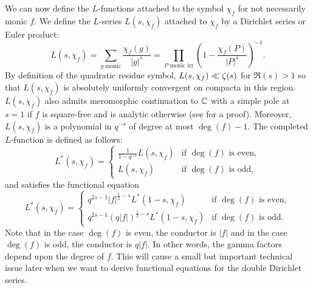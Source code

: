 \documentclass[12pt,reqno,oneside]{amsart}
\begin{document}
    We can now define the $L$-functions attached to the symbol $\chi_{f}$ for not necessarily monic $f$. We define the $L$-series $L(s,\chi_{f})$ attached to $\chi_{f}$ by a Dirichlet series or Euler product:
    \[
        L(s,\chi_{f}) = \sum_{\text{$g$ monic}}\frac{\chi_{f}(g)}{|g|^{s}} = \prod_{\text{$P$ monic irr}}\left(1-\frac{\chi_{f}(P)}{|P|^{s}}\right)^{-1}.
    \]
    By definition of the quadratic residue symbol, $L(s,\chi_{f}) \ll \zeta(s)$ for $\Re(s) > 1$ so that $L(s,\chi_{f})$ is absolutely uniformly convergent on compacta in this region. $L(s,\chi_{f})$ also admits meromorphic continuation to $\mathbb{C}$ with a simple pole at $s = 1$ if $f$ is square-free and is analytic otherwise (see \cite{R} for a proof). Moreover, $L(s,\chi_{f})$ is a polynomial in $q^{-s}$ of degree at most $\deg(f)-1$. The completed $L$-function is defined as follows:
    \[
        L^{\ast}(s,\chi_{f}) = \begin{cases} \frac{1}{1-q^{-s}}L(s,\chi_{f}) & \text{if $\deg(f)$ is even}, \\ L(s,\chi_{f}) & \text{if $\deg(f)$ is odd}, \end{cases}
    \]
    and satisfies the functional equation
    \[
        L^{\ast}(s,\chi_{f}) = \begin{cases} q^{2s-1}|f|^{\frac{1}{2}-s}L^{\ast}(1-s,\chi_{f}) & \text{if $\deg(f)$ is even}, \\ q^{2s-1}(q|f|)^{\frac{1}{2}-s}L^{\ast}(1-s,\chi_{f}) & \text{if $\deg(f)$ is odd}. \end{cases}
    \]
    Note that in the case $\deg(f)$ is even, the conductor is $|f|$ and in the case $\deg(f)$ is odd, the conductor is $q|f|$. In other words, the gamma factors depend upon the degree of $f$. This will cause a small but important technical issue later when we want to derive functional equations for the double Dirichlet series.
\end{document}
